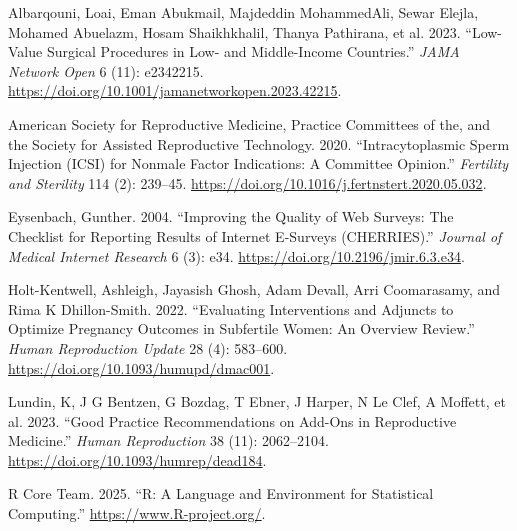 \documentclass[
  letterpaper,
  DIV=11,
  numbers=noendperiod]{scrartcl}
\newlength{\cslhangindent}
\newenvironment{CSLReferences}[2] %
 {\begin{list}{}{%
  \setlength{\itemindent}{0pt}
  \setlength{\leftmargin}{0pt}
  \setlength{\parsep}{0pt}
  \ifodd #1
   \setlength{\leftmargin}{\cslhangindent}
   \setlength{\itemindent}{-1\cslhangindent}
  \fi
  \setlength{\itemsep}{#2\baselineskip}}}
 {\end{list}}
\begin{document}
\label{refs}
\begin{CSLReferences}{1}{0}
Albarqouni, Loai, Eman Abukmail, Majdeddin MohammedAli, Sewar Elejla,
Mohamed Abuelazm, Hosam Shaikhkhalil, Thanya Pathirana, et al. 2023.
{``Low-Value Surgical Procedures in Low- and Middle-Income Countries.''}
\emph{JAMA Network Open} 6 (11): e2342215.
\url{https://doi.org/10.1001/jamanetworkopen.2023.42215}.

American Society for Reproductive Medicine, Practice Committees of the,
and the Society for Assisted Reproductive Technology. 2020.
{``Intracytoplasmic Sperm Injection (ICSI) for Non{\textendash}male
Factor Indications: A Committee Opinion.''} \emph{Fertility and
Sterility} 114 (2): 239--45.
\url{https://doi.org/10.1016/j.fertnstert.2020.05.032}.

Eysenbach, Gunther. 2004. {``Improving the Quality of Web Surveys: The
Checklist for Reporting Results of Internet E-Surveys (CHERRIES).''}
\emph{Journal of Medical Internet Research} 6 (3): e34.
\url{https://doi.org/10.2196/jmir.6.3.e34}.

Holt-Kentwell, Ashleigh, Jayasish Ghosh, Adam Devall, Arri Coomarasamy,
and Rima K Dhillon-Smith. 2022. {``Evaluating Interventions and Adjuncts
to Optimize Pregnancy Outcomes in Subfertile Women: An Overview
Review.''} \emph{Human Reproduction Update} 28 (4): 583--600.
\url{https://doi.org/10.1093/humupd/dmac001}.

Lundin, K, J G Bentzen, G Bozdag, T Ebner, J Harper, N Le Clef, A
Moffett, et al. 2023. {``Good Practice Recommendations on Add-Ons in
Reproductive Medicine.''} \emph{Human Reproduction} 38 (11): 2062--2104.
\url{https://doi.org/10.1093/humrep/dead184}.

R Core Team. 2025. {``R: A Language and Environment for Statistical
Computing.''} \url{https://www.R-project.org/}.

\end{CSLReferences}
\end{document}
